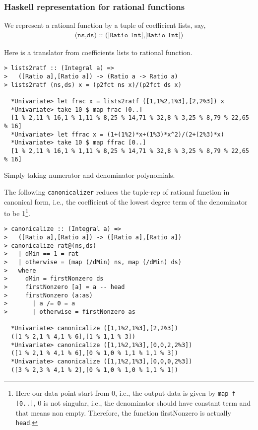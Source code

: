 \documentclass[11pt]{book}
\begin{document}
\subsubsection{Haskell representation for rational functions}
We represent a rational function by a tuple of coefficient lists, say,
\begin{eqnarray}
\texttt{(ns,ds) :: ([Ratio Int],[Ratio Int])}
\end{eqnarray}

Here is a translator from coefficients lists to rational function.
\begin{verbatim}
> lists2ratf :: (Integral a) => 
>   ([Ratio a],[Ratio a]) -> (Ratio a -> Ratio a)
> lists2ratf (ns,ds) x = (p2fct ns x)/(p2fct ds x)

  *Univariate> let frac x = lists2ratf ([1,1%2,1%3],[2,2%3]) x
  *Univariate> take 10 $ map frac [0..]
  [1 % 2,11 % 16,1 % 1,11 % 8,25 % 14,71 % 32,8 % 3,25 % 8,79 % 22,65 % 16]
  *Univariate> let ffrac x = (1+(1%2)*x+(1%3)*x^2)/(2+(2%3)*x)
  *Univariate> take 10 $ map ffrac [0..]
  [1 % 2,11 % 16,1 % 1,11 % 8,25 % 14,71 % 32,8 % 3,25 % 8,79 % 22,65 % 16]  
\end{verbatim}
Simply taking numerator and denominator polynomials.

The following \texttt{canonicalizer} reduces the tuple-rep of rational function in canonical form, i.e., the coefficient of the lowest degree term of the denominator to be 1\footnote{
Here our data point start from 0, i.e., the output data is given by \texttt{map f [0..]}, 0 is not singular, i.e., the denominator should have constant term and that means non empty.
Therefore, the function firstNonzero is actually \texttt{head}.
}.
\begin{verbatim}
> canonicalize :: (Integral a) => 
>   ([Ratio a],[Ratio a]) -> ([Ratio a],[Ratio a])
> canonicalize rat@(ns,ds)
>   | dMin == 1 = rat
>   | otherwise = (map (/dMin) ns, map (/dMin) ds)
>   where
>     dMin = firstNonzero ds
>     firstNonzero [a] = a -- head
>     firstNonzero (a:as)
>       | a /= 0 = a
>       | otherwise = firstNonzero as

  *Univariate> canonicalize ([1,1%2,1%3],[2,2%3])
  ([1 % 2,1 % 4,1 % 6],[1 % 1,1 % 3])
  *Univariate> canonicalize ([1,1%2,1%3],[0,0,2,2%3])
  ([1 % 2,1 % 4,1 % 6],[0 % 1,0 % 1,1 % 1,1 % 3])
  *Univariate> canonicalize ([1,1%2,1%3],[0,0,0,2%3])
  ([3 % 2,3 % 4,1 % 2],[0 % 1,0 % 1,0 % 1,1 % 1])
\end{verbatim}
\end{document}
